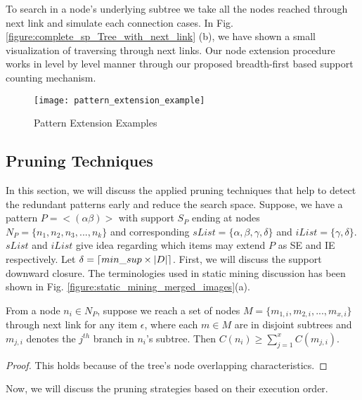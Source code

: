 To search in a node's underlying subtree we take all the nodes reached through next link and simulate each connection cases. In Fig. \ref{figure:complete_sp_Tree_with_next_link} (b), we have shown a small visualization of traversing through next links. Our node extension procedure works in level by level manner through our proposed breadth-first based support counting mechanism. 

\begin{figure*}[!tb]
\centering
\texttt{[image: pattern\_extension\_example]}
\caption{Pattern Extension Examples} \label{figure:pattern_extension_example}
\hfil
\end{figure*}


\subsection{Pruning Techniques}
In this section, we will discuss the applied pruning techniques that help to detect the redundant patterns early and reduce the search space. Suppose, we have a pattern $P=< (\alpha\beta) >$ with support $S_{P}$ ending at nodes $N_{P}=\{n_{1},n_{2},n_{3},...,n_{k}\}$ and corresponding $sList=\{\alpha,\beta,\gamma,\delta\}$ and $iList=\{\gamma,\delta\}$. $sList$ and $iList$ give idea regarding which items may extend $P$ as SE and IE respectively. Let $\delta= \lceil min\_sup \times \vert D \vert\rceil$. First, we will discuss the support downward closure. The terminologies used in static mining discussion has been shown in Fig. \ref{figure:static_mining_merged_images}(a).

\begin{lem} \label{lem:support_constraint}
    From a node $n_{i} \in N_{P}$, suppose we reach a set of nodes $M=\{m_{1,i},m_{2,i},...,m_{x,i}\}$ through next link for any item $\epsilon$, where each $m \in M$ are in disjoint subtrees and $m_{j,i}$ denotes the $j^{th}$ branch in $n_{i}$'s subtree. Then $C(n_{i}) \geq  \sum_{j=1}^{x} C(m_{j,i})$. 
\end{lem}
\begin{proof}
    This holds because of the tree's node overlapping characteristics. 
\end{proof}
Now, we will discuss the pruning strategies based on their execution order. 
